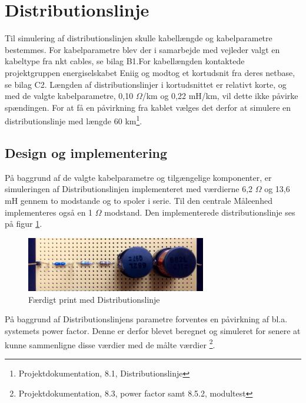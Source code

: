 
\section{Distributionslinje}

Til simulering af distributionslinjen skulle kabellængde og kabelparametre bestemmes. For kabelparametre blev der i samarbejde med vejleder valgt en kabeltype fra nkt cables, se bilag B1.For kabellængden kontaktede projektgruppen energiselskabet Eniig og modtog et kortudsnit fra deres netbase, se bilag C2. Længden af distributionslinjer i kortudsnittet er relativt korte, og med de valgte kabelparametre, 0,10 $\Omega$/km og 0,22 mH/km, vil dette ikke påvirke spændingen. For at få en påvirkning fra kablet vælges det derfor at simulere en distributionslinje med længde 60 km\footnote{Projektdokumentation, 8.1, Distributionslinje}.  

\subsection{Design og implementering}

På baggrund af de valgte kabelparametre og tilgængelige komponenter, er simuleringen af Distributionslinjen implementeret med værdierne 6,2 $\Omega$ og 13,6 mH gennem to modstande og to spoler i serie. Til den centrale Måleenhed implementeres også en 1 $\Omega$ modstand. Den implementerede distributionslinje ses på figur \ref{fig:DisbLinje}.

\begin{figure}[H]
	\centering
	\includegraphics[width=0.7\textwidth]{figure/Distributionslinje}
	\caption{Færdigt print med Distributionslinje}
	\label{fig:DisbLinje}
\end{figure}

På baggrund af Distributionslinjens parametre forventes en påvirkning af bl.a. systemets power factor. Denne er derfor blevet beregnet og simuleret for senere at kunne sammenligne disse værdier med de målte værdier \footnote{Projektdokumentation, 8.3, power factor samt 8.5.2, modultest}. 